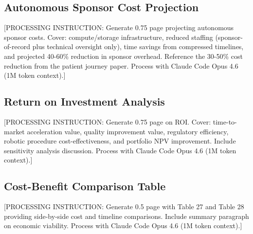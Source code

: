 \subsection{Autonomous Sponsor Cost Projection}

[PROCESSING INSTRUCTION: Generate 0.75 page projecting autonomous sponsor costs. Cover:
compute/storage infrastructure, reduced staffing (sponsor-of-record plus technical
oversight only), time savings from compressed timelines, and projected 40-60\% reduction
in sponsor overhead. Reference the 30-50\% cost reduction from the patient journey paper.
Process with Claude Code Opus 4.6 (1M token context).]

\subsection{Return on Investment Analysis}

[PROCESSING INSTRUCTION: Generate 0.75 page on ROI. Cover: time-to-market acceleration
value, quality improvement value, regulatory efficiency, robotic procedure cost-effectiveness,
and portfolio NPV improvement. Include sensitivity analysis discussion.
Process with Claude Code Opus 4.6 (1M token context).]

\subsection{Cost-Benefit Comparison Table}

[PROCESSING INSTRUCTION: Generate 0.5 page with Table 27 and Table 28 providing side-by-side
cost and timeline comparisons. Include summary paragraph on economic viability.
Process with Claude Code Opus 4.6 (1M token context).]
